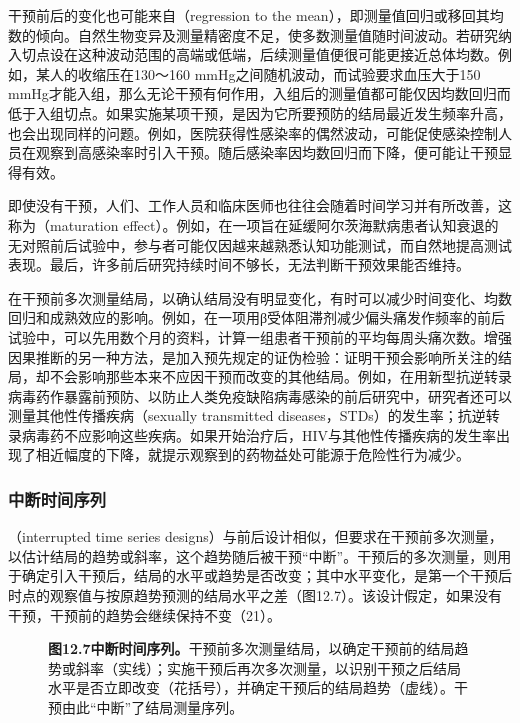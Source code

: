 干预前后的变化也可能来自（regression to the mean），即测量值回归或移回其均数的倾向。自然生物变异及测量精密度不足，使多数测量值随时间波动。若研究纳入切点设在这种波动范围的高端或低端，后续测量值便很可能更接近总体均数。例如，某人的收缩压在130～160 mmHg之间随机波动，而试验要求血压大于150 mmHg才能入组，那么无论干预有何作用，入组后的测量值都可能仅因均数回归而低于入组切点。如果实施某项干预，是因为它所要预防的结局最近发生频率升高，也会出现同样的问题。例如，医院获得性感染率的偶然波动，可能促使感染控制人员在观察到高感染率时引入干预。随后感染率因均数回归而下降，便可能让干预显得有效。

即使没有干预，人们、工作人员和临床医师也往往会随着时间学习并有所改善，这称为（maturation effect）。例如，在一项旨在延缓阿尔茨海默病患者认知衰退的无对照前后试验中，参与者可能仅因越来越熟悉认知功能测试，而自然地提高测试表现。最后，许多前后研究持续时间不够长，无法判断干预效果能否维持。

在干预前多次测量结局，以确认结局没有明显变化，有时可以减少时间变化、均数回归和成熟效应的影响。例如，在一项用β受体阻滞剂减少偏头痛发作频率的前后试验中，可以先用数个月的资料，计算一组患者干预前的平均每周头痛次数。增强因果推断的另一种方法，是加入预先规定的证伪检验：证明干预会影响所关注的结局，却不会影响那些本来不应因干预而改变的其他结局。例如，在用新型抗逆转录病毒药作暴露前预防、以防止人类免疫缺陷病毒感染的前后研究中，研究者还可以测量其他性传播疾病（sexually transmitted diseases，STDs）的发生率；抗逆转录病毒药不应影响这些疾病。如果开始治疗后，HIV与其他性传播疾病的发生率出现了相近幅度的下降，就提示观察到的药物益处可能源于危险性行为减少。

\subsubsection{中断时间序列}
（interrupted time series designs）与前后设计相似，但要求在干预前多次测量，以估计结局的趋势或斜率，这个趋势随后被干预“中断”。干预后的多次测量，则用于确定引入干预后，结局的水平或趋势是否改变；其中水平变化，是第一个干预后时点的观察值与按原趋势预测的结局水平之差（图12.7）。该设计假定，如果没有干预，干预前的趋势会继续保持不变（21）。
\begin{figure}[htbp]\centering\chTwelveTimeSeries
\caption*{\textbf{图12.7\quad 中断时间序列。}干预前多次测量结局，以确定干预前的结局趋势或斜率（实线）；实施干预后再次多次测量，以识别干预之后结局水平是否立即改变（花括号），并确定干预后的结局趋势（虚线）。干预由此“中断”了结局测量序列。}
\end{figure}

